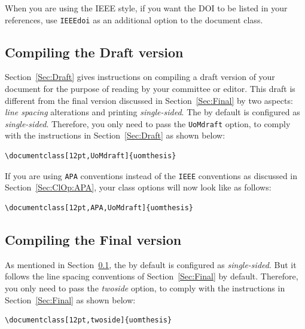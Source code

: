 \documentclass[12pt]{uomthesis}
\begin{document}
When you are using the IEEE style, if you want the DOI to be listed in your references, use \texttt{IEEEdoi} as an additional option to the document class.

\subsection{Compiling the Draft version}
\label{Sec:ClOp:Draft}

Section~\ref{Sec:Draft} gives instructions on compiling a draft version of your document for the purpose of reading by your committee or editor. This draft is different from the final version discussed in Section~\ref{Sec:Final} by two aspects: \textit{line spacing} alterations and printing \textit{single-sided}. The \TheClass{} by default is configured as \textit{single-sided}. Therefore, you only need to pass the \texttt{UoMdraft} option, to comply with the instructions in Section~\ref{Sec:Draft} as shown below:

\begin{indentedQuote}
\begin{verbatim}
\documentclass[12pt,UoMdraft]{uomthesis}
\end{verbatim}
\end{indentedQuote}

If you are using \texttt{APA} conventions instead of the \texttt{IEEE} conventions as discussed in Section~\ref{Sec:ClOp:APA}, your class options will now look like as follows:

\begin{indentedQuote}
\begin{verbatim}
\documentclass[12pt,APA,UoMdraft]{uomthesis}
\end{verbatim}
\end{indentedQuote}

\subsection{Compiling the Final version}
\label{Sec:ClOp:Final}

As mentioned in Section~\ref{Sec:ClOp:Draft}, the \TheClass{} by default is configured as \textit{single-sided}. But it follows the line spacing conventions of Section~\ref{Sec:Final} by default. Therefore, you only need to pass the \textit{twoside} option, to comply with the instructions in Section~\ref{Sec:Final} as shown below:

\begin{indentedQuote}
\begin{verbatim}
\documentclass[12pt,twoside]{uomthesis}
\end{verbatim}
\end{indentedQuote}
\end{document}
